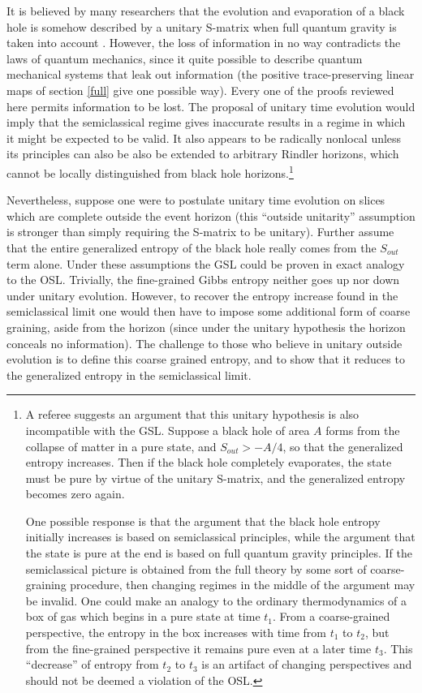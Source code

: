 \documentclass{article}
\begin{document}
It is believed by many researchers that the evolution and evaporation of a black hole is somehow described by a unitary S-matrix when full quantum gravity is taken into account \cite{preskill93}.  However, the loss of information in no way contradicts the laws of quantum mechanics, since it quite possible to describe quantum mechanical systems that leak out information (the positive trace-preserving linear maps of section \ref{full} give one possible way).  Every one of the proofs reviewed here permits information to be lost.  The proposal of unitary time evolution would imply that the semiclassical regime gives inaccurate results in a regime in which it might be expected to be valid.  It also appears to be radically nonlocal unless its principles can also be also be extended to arbitrary Rindler horizons, which cannot be locally distinguished from black hole horizons.\footnote{A referee suggests an argument that this unitary hypothesis is also incompatible with the GSL.  Suppose a black hole of area $A$ forms from the collapse of matter in a pure state, and $S_{out} > -A/4$, so that the generalized entropy increases.  Then if the black hole completely evaporates, the state must be pure by virtue of the unitary S-matrix, and the generalized entropy becomes zero again.

One possible response is that the argument that the black hole entropy initially increases is based on semiclassical principles, while the argument that the state is pure at the end is based on full quantum gravity principles.  If the semiclassical picture is obtained from the full theory by some sort of coarse-graining procedure, then changing regimes in the middle of the argument may be invalid.  One could make an analogy to the ordinary thermodynamics of a box of gas which begins in a pure state at time $t_1$.  From a coarse-grained perspective, the entropy in the box increases with time from $t_1$ to $t_2$, but from the fine-grained perspective it remains pure even at a later time $t_3$.  This ``decrease'' of entropy from $t_2$ to $t_3$ is an artifact of changing perspectives and should not be deemed a violation of the OSL.}

Nevertheless, suppose one were to postulate unitary time evolution on slices which are complete outside the event horizon (this ``outside unitarity'' assumption is stronger than simply requiring the S-matrix to be unitary).  Further assume that the entire generalized entropy of the black hole really comes from the $S_{out}$ term alone.  Under these assumptions the GSL could be proven in exact analogy to the OSL.  Trivially, the fine-grained Gibbs entropy neither goes up nor down under unitary evolution.  However, to recover the entropy increase found in the semiclassical limit one would then have to impose some additional form of coarse graining, aside from the horizon (since under the unitary hypothesis the horizon conceals no information).  The challenge to those who believe in unitary outside evolution is to define this coarse grained entropy, and to show that it reduces to the generalized entropy in the semiclassical limit.
\end{document}
